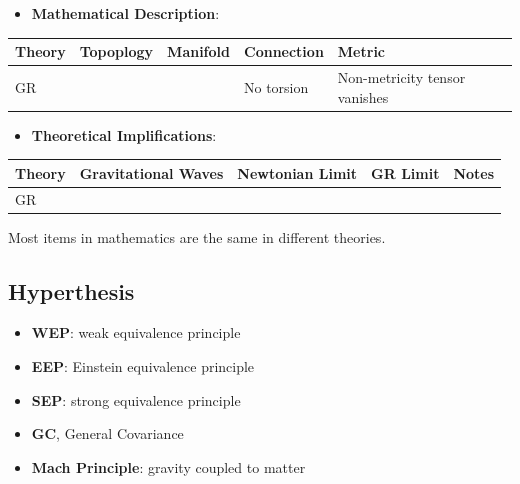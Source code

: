 \documentclass[letterpaper,10pt,english]{sphinxmanual}
\begin{document}
\begin{itemize}
\item {} 
\textbf{Mathematical Description}:

\end{itemize}

\begin{tabulary}{\linewidth}{|L|L|L|L|L|}
\hline
\textsf{\relax 
Theory
} & \textsf{\relax 
Topoplogy
} & \textsf{\relax 
Manifold
} & \textsf{\relax 
Connection
} & \textsf{\relax 
Metric
}\\
\hline
GR
 &  &  & 
No torsion
 & 
Non-metricity tensor vanishes
\\
\hline\end{tabulary}

\begin{itemize}
\item {} 
\textbf{Theoretical Implifications}:

\end{itemize}

\begin{tabulary}{\linewidth}{|L|L|L|L|L|}
\hline
\textsf{\relax 
Theory
} & \textsf{\relax 
Gravitational Waves
} & \textsf{\relax 
Newtonian Limit
} & \textsf{\relax 
GR Limit
} & \textsf{\relax 
Notes
}\\
\hline
GR
 &  &  &  & \\
\hline\end{tabulary}


Most items in mathematics are the same in different theories.


\subsection{Hyperthesis}
\label{relativity/GeneralRelativityAdv:hyperthesis}\begin{itemize}
\item {} 
\textbf{WEP}: weak equivalence principle

\item {} 
\textbf{EEP}: Einstein equivalence principle

\item {} 
\textbf{SEP}: strong equivalence principle

\item {} 
\textbf{GC}, General Covariance

\item {} 
\textbf{Mach Principle}: gravity coupled to matter

\end{itemize}
\end{document}
